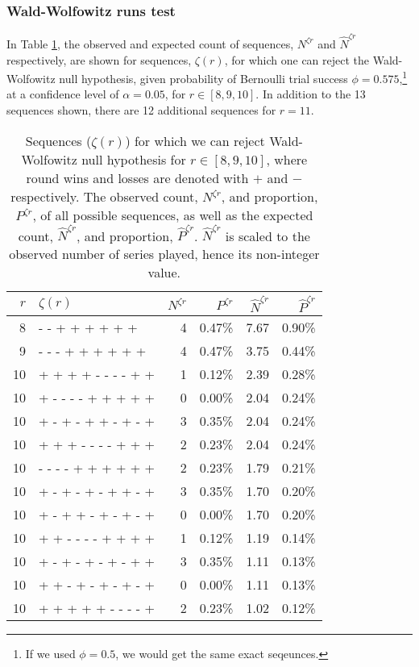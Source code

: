 \documentclass{article}
\begin{document}
\hypertarget{wald-wolfowitz-runs-test-1}{%
\subsubsection{Wald-Wolfowitz runs
test}\label{wald-wolfowitz-runs-test-1}}

In Table \ref{tbl:ww-sequences}, the observed and expected count of
sequences, \(N^{\zeta r}\) and \(\hat{N}^{\zeta r}\) respectively, are
shown for sequences, \(\zeta(r)\), for which one can reject the
Wald-Wolfowitz null hypothesis, given probability of Bernoulli trial
success \(\phi = 0.575\),\footnote{If we used \(\phi = 0.5\), we would
  get the same exact seqeunces.} at a confidence level of
\(\alpha = 0.05\), for \(r \in [8, 9, 10]\). In addition to the 13
sequences shown, there are 12 additional sequences for \(r = 11\).

\begin{table}

\caption{Sequences ($\zeta(r)$) for which we can reject Wald-Wolfowitz null hypothesis for $r \in [8, 9, 10]$, where round wins and losses are denoted with $+$ and $-$ respectively. The observed count, $N^{\zeta r}$, and proportion, $P^{\zeta r}$, of all possible sequences, as well as the expected count, $\hat{N}^{\zeta r}$, and proportion, $\hat{P}^{\zeta r}$. $\hat{N}^{\zeta r}$ is scaled to the observed number of series played, hence its non-integer value.}

\centering
\begin{tabular}{rlrrrr}
\toprule
$r$ & $\zeta(r)$ & $N^{\zeta r}$ & $P^{\zeta r}$ & $\hat{N}^{\zeta r}$ & $\hat{P}^{\zeta r}$ \\ 
\midrule
8 & - - + + + + + + & 4 & 0.47\% & 7.67 & 0.90\% \\ 
9 & - - - + + + + + + & 4 & 0.47\% & 3.75 & 0.44\% \\ 
10 & + + + + - - - - + + & 1 & 0.12\% & 2.39 & 0.28\% \\ 
10 & + - - - - + + + + + & 0 & 0.00\% & 2.04 & 0.24\% \\ 
10 & + - + - + + - + - + & 3 & 0.35\% & 2.04 & 0.24\% \\ 
10 & + + + - - - - + + + & 2 & 0.23\% & 2.04 & 0.24\% \\ 
10 & - - - - + + + + + + & 2 & 0.23\% & 1.79 & 0.21\% \\ 
10 & + - + - + - + + - + & 3 & 0.35\% & 1.70 & 0.20\% \\ 
10 & + - + + - + - + - + & 0 & 0.00\% & 1.70 & 0.20\% \\ 
10 & + + - - - - + + + + & 1 & 0.12\% & 1.19 & 0.14\% \\ 
10 & + - + - + - + - + + & 3 & 0.35\% & 1.11 & 0.13\% \\ 
10 & + + - + - + - + - + & 0 & 0.00\% & 1.11 & 0.13\% \\ 
10 & + + + + + - - - - + & 2 & 0.23\% & 1.02 & 0.12\% \\ 

\bottomrule
\end{tabular}

\label{tbl:ww-sequences}
\end{table}
\end{document}
